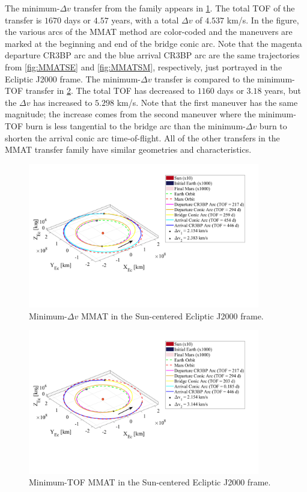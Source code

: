 The minimum-$\Delta v$ transfer from the family appears in \cref{fig:MMATDv}. The total TOF of the
transfer is $1670$ days or $4.57$ years, with a total $\Delta v$ of $4.537$ km/s. In the figure,
the various arcs of the MMAT method are color-coded and the maneuvers are marked at the beginning
and end of the bridge conic arc. Note that the magenta departure CR3BP arc and the blue arrival
CR3BP arc are the same trajectories from \cref{fig:MMATSE} and \cref{fig:MMATSM}, respectively,
just portrayed in the Ecliptic J2000 frame. The minimum-$\Delta v$ transfer is compared to the
minimum-TOF transfer in \cref{fig:MMATTOF}. The total TOF has decreased to $1160$ days or
$3.18$ years, but the $\Delta v$ has increased to $5.298$ km/s. Note that the first maneuver has
the same magnitude; the increase comes from the second maneuver where the minimum-TOF burn is less
tangential to the bridge arc than the minimum-$\Delta v$ burn to shorten the arrival conic arc
time-of-flight. All of the other transfers in the MMAT transfer family have similar geometries and
characteristics.

\begin{figure}[H]
    \centering
    \includegraphics[width=0.9\textwidth]{figures/MinDvMMAT.pdf}
    \caption{Minimum-$\Delta v$ MMAT in the Sun-centered Ecliptic J2000 frame.}
    \label{fig:MMATDv}
\end{figure}

\begin{figure}[H]
    \centering
    \includegraphics[width=0.9\textwidth]{figures/MinTOFMMAT.pdf}
    \caption{Minimum-TOF MMAT in the Sun-centered Ecliptic J2000 frame.}
    \label{fig:MMATTOF}
\end{figure}
